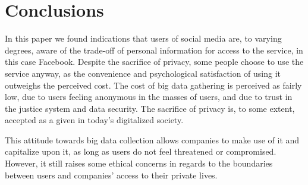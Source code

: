 \chapter{Conclusions}
In this paper we found indications that users of social media are, to varying degrees, aware of the trade-off of personal information for access to the service, in this case Facebook. Despite the sacrifice of privacy, some people choose to use the service anyway, as the convenience and psychological satisfaction of using it outweighs the perceived cost. The cost of big data gathering is perceived as fairly low, due to users feeling anonymous in the masses of users, and due to trust in the justice system and data security. The sacrifice of privacy is, to some extent, accepted as a given in today’s digitalized society.

This attitude towards big data collection allows companies to make use of it and capitalize upon it, as long as users do not feel threatened or compromised. However, it still raises some ethical concerns in regards to the boundaries between users and companies’ access to their private lives.